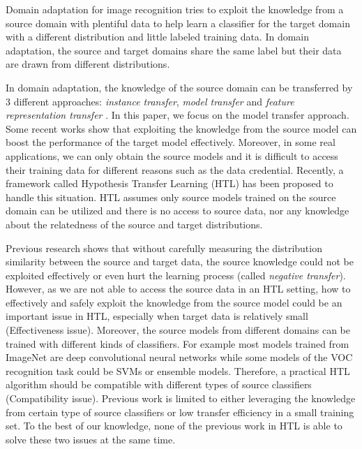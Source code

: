 Domain adaptation for image recognition tries to exploit the knowledge from a source domain with plentiful data to help learn a classifier for the target domain with a different distribution and little labeled training data. In domain adaptation, the source and target domains share the same label but their data are drawn from different distributions.

In domain adaptation, the knowledge of the source domain can be transferred by 3 different approaches: \textit{instance transfer}, \textit{model transfer} and \textit{feature representation transfer} \cite{pan2010survey}. In this paper, we focus on the model transfer approach. Some recent works show that exploiting the knowledge from the source model can boost the performance of the target model effectively\cite{kuzborskij2013n,tommasi2014learning}.
Moreover, in some real applications, we can only obtain the source models and it is difficult to access their training data for different reasons such as the data credential.   
Recently, a framework called Hypothesis Transfer Learning (HTL) \cite{kuzborskij2013stability} has been proposed to handle this situation. HTL assumes only source models trained on the source domain can be utilized and there is no access to source data, nor any knowledge about the relatedness of the source and target distributions. 


Previous research \cite{ben2010theory,ben2007analysis} shows that without carefully measuring the distribution similarity between the source and target data, the source knowledge could not be exploited effectively or even hurt the learning process (called  \textit{negative transfer})\cite{pan2010survey}. 
However, as we are not able to access the source data in an HTL setting, how to effectively and safely exploit the knowledge from the source model could be an important issue in HTL, especially when target data is relatively small (Effectiveness issue). Moreover, the source models from different domains can be trained with different kinds of classifiers. For example most models trained from ImageNet are deep convolutional neural networks while some models of the VOC recognition task could be SVMs or ensemble models. Therefore, a practical HTL algorithm should be compatible with different types of source classifiers (Compatibility issue). Previous work is limited to either leveraging the knowledge from certain type of source classifiers \cite{tommasi2014learning,fei2006one} or low transfer efficiency in a small training set\cite{jie2011multiclass}. To the best of our knowledge, none of the previous work in HTL is able to solve these two issues at the same time.

